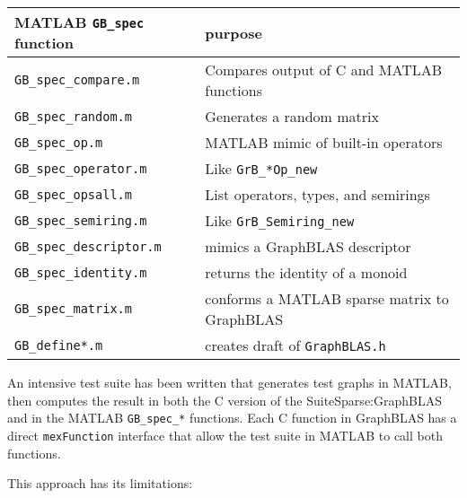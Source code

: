 \documentclass[12pt]{article}
\begin{document}
\vspace{0.1in}
{\footnotesize
\begin{tabular}{ll}
MATLAB \verb'GB_spec' function  & purpose \\
\hline
\verb'GB_spec_compare.m'        & Compares output of C and MATLAB functions \\
\verb'GB_spec_random.m'         & Generates a random matrix \\
\verb'GB_spec_op.m'             & MATLAB mimic of built-in operators \\
\verb'GB_spec_operator.m'       & Like \verb'GrB_*Op_new' \\
\verb'GB_spec_opsall.m'         & List operators, types, and semirings \\
\verb'GB_spec_semiring.m'       & Like \verb'GrB_Semiring_new' \\
\verb'GB_spec_descriptor.m'     & mimics a GraphBLAS descriptor \\
\verb'GB_spec_identity.m'       & returns the identity of a monoid \\
\verb'GB_spec_matrix.m'         & conforms a MATLAB sparse matrix to GraphBLAS \\
\verb'GB_define*.m'             & creates draft of \verb'GraphBLAS.h' \\
\hline
\end{tabular}
}

\newpage
An intensive test suite has been written that generates test graphs in MATLAB,
then computes the result in both the C version of the SuiteSparse:GraphBLAS and
in the MATLAB \verb'GB_spec_*' functions.  Each C function in GraphBLAS has
a direct \verb'mexFunction' interface that allow the test suite in MATLAB
to call both functions.

This approach has its limitations:
\end{document}
